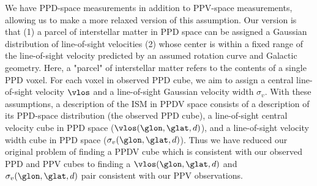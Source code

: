 We have PPD-space measurements in addition to PPV-space measurements, allowing us to make a more relaxed version of this assumption. 
Our version is that (1) a parcel of interstellar matter in PPD space can be assigned a Gaussian distribution of line-of-sight velocities (2) whose center is within a fixed range of the line-of-sight velocity predicted by an assumed rotation curve and Galactic geometry. 
Here, a "parcel" of interstellar matter refers to the contents of a single PPD voxel. 
For each voxel in observed PPD cube, we aim to assign a central line-of-sight velocity $\vlos$ and a line-of-sight Gaussian velocity width $\sigma_v$. 
With these assumptions, a description of the ISM in PPDV space consists of a description of its PPD-space distribution (the observed PPD cube), a line-of-sight central velocity cube in PPD space ($\vlos(\glon, \glat, d)$), and a line-of-sight velocity width cube in PPD space ($\sigma_v (\glon, \glat, d)$). 
Thus we have reduced our original problem of finding a PPDV cube which is consistent with our observed PPD and PPV cubes to finding a $\vlos(\glon, \glat, d)$ and $\sigma_v(\glon, \glat, d)$ pair consistent with our PPV observations.


